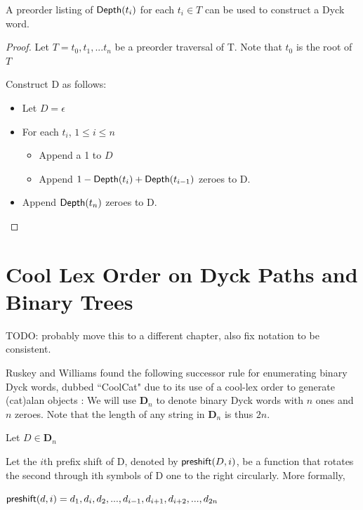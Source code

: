 \begin{remark}A preorder listing of $\mathsf{Depth}{(t_i)} $ for each $ t_i \in T$ can be used to construct a Dyck word. \label{re:construct_dyck}

\end{remark} 
\begin{proof}

    Let $T=t_0,t_1,...t_n$ be a preorder traversal of T.  Note that $t_0$ is the root of $T$

    Construct D as follows: 

    \begin{itemize}
	\item Let $D=\epsilon$ %
	\item For each $t_i$, $1\le i \le n$
	    \begin{itemize}
		\item Append a 1 to $D$
		\item Append $1-\mathsf{Depth}{(t_{i})}+\mathsf{Depth}{(t_{i-1})}$ zeroes to D.
	    \end{itemize}
	\item Append $\mathsf{Depth}{(t_{n})}$ zeroes to D. 
    \end{itemize}
\end{proof} 

\section{Cool Lex Order on Dyck Paths and Binary Trees}
TODO: probably move this to a different chapter, also fix notation to be consistent. 

Ruskey and Williams found the following successor rule for enumerating binary Dyck words, dubbed ``CoolCat" due to its use of a cool-lex order to generate (cat)alan objects \cite{ruskey2008generating}:
We will use $\mathbf{D}_n$ to denote binary Dyck words with $n$ ones and $n$ zeroes.  Note that the length of any string in $\mathbf{D}_n$ is thus $2n$.

\noindent Let $D \in \mathbf{D}_n$

\noindent Let the $i$th prefix shift of D, denoted by $\mathsf{preshift(} D, i \mathsf{)}$, be a function that rotates the second through ith symbols of D one to the right circularly.  More formally, 

\noindent $\mathsf{preshift(} d, i \mathsf{)}=d_1,d_i,d_2,...,d_{i-1},d_{i+1},d_{i+2},...,d_{2n}$


